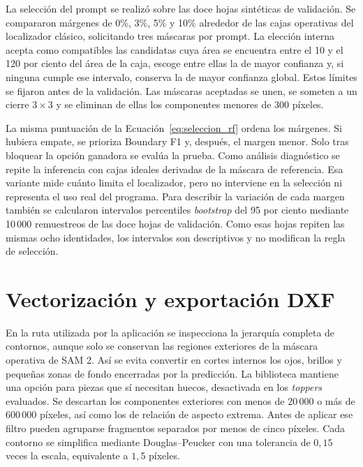 
La selección del prompt se realizó sobre las doce hojas sintéticas de validación. Se compararon márgenes de 0\%, 3\%, 5\% y 10\% alrededor de las cajas operativas del localizador clásico, solicitando tres máscaras por prompt. La elección interna acepta como compatibles las candidatas cuya área se encuentra entre el 10 y el 120 por ciento del área de la caja, escoge entre ellas la de mayor confianza y, si ninguna cumple ese intervalo, conserva la de mayor confianza global. Estos límites se fijaron antes de la validación. Las máscaras aceptadas se unen, se someten a un cierre $3\times3$ y se eliminan de ellas los componentes menores de 300 píxeles.

La misma puntuación de la Ecuación~\ref{eq:seleccion_rf} ordena los márgenes. Si hubiera empate, se prioriza Boundary F1 y, después, el margen menor. Solo tras bloquear la opción ganadora se evalúa la prueba. Como análisis diagnóstico se repite la inferencia con cajas ideales derivadas de la máscara de referencia. Esa variante mide cuánto limita el localizador, pero no interviene en la selección ni representa el uso real del programa. Para describir la variación de cada margen también se calcularon intervalos percentiles \textit{bootstrap} del 95 por ciento mediante 10\,000 remuestreos de las doce hojas de validación. Como esas hojas repiten las mismas ocho identidades, los intervalos son descriptivos y no modifican la regla de selección.

\section{Vectorización y exportación DXF}

En la ruta utilizada por la aplicación se inspecciona la jerarquía completa de contornos, aunque solo se conservan las regiones exteriores de la máscara operativa de SAM 2. Así se evita convertir en cortes internos los ojos, brillos y pequeñas zonas de fondo encerradas por la predicción. La biblioteca mantiene una opción para piezas que sí necesitan huecos, desactivada en los \textit{toppers} evaluados. Se descartan los componentes exteriores con menos de 20\,000 o más de 600\,000 píxeles, así como los de relación de aspecto extrema. Antes de aplicar ese filtro pueden agruparse fragmentos separados por menos de cinco píxeles. Cada contorno se simplifica mediante Douglas--Peucker \cite{DouglasPeucker1973} con una tolerancia de $0{,}15$ veces la escala, equivalente a $1{,}5$ píxeles.

